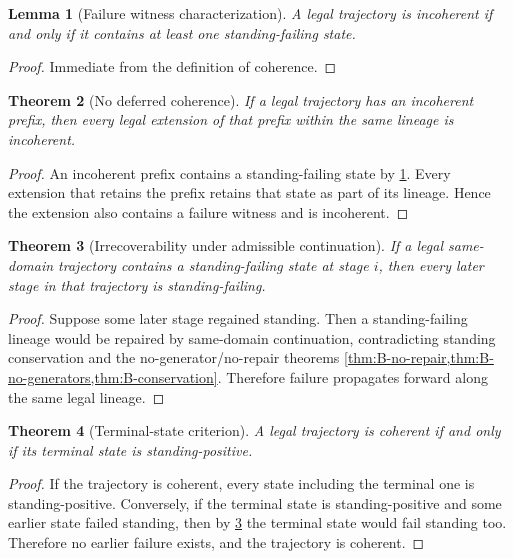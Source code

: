 \documentclass[11pt]{article}
\theoremstyle{plain}
\newtheorem{theorem}{Theorem}[section]
\newtheorem{lemma}[theorem]{Lemma}
\theoremstyle{definition}
\begin{document}
\begin{lemma}[Failure witness characterization]
\label{lem:D-failure}
A legal trajectory is incoherent if and only if it contains at least one standing-failing state.
\end{lemma}

\begin{proof}
Immediate from the definition of coherence.
\end{proof}

\begin{theorem}[No deferred coherence]
\label{thm:D-no-deferred}
If a legal trajectory has an incoherent prefix, then every legal extension of that prefix within the same lineage is incoherent.
\end{theorem}

\begin{proof}
An incoherent prefix contains a standing-failing state by \cref{lem:D-failure}. Every extension that retains the prefix retains that state as part of its lineage. Hence the extension also contains a failure witness and is incoherent.
\end{proof}

\begin{theorem}[Irrecoverability under admissible continuation]
\label{thm:D-irrecoverable}
If a legal same-domain trajectory contains a standing-failing state at stage $i$, then every later stage in that trajectory is standing-failing.
\end{theorem}

\begin{proof}
Suppose some later stage regained standing. Then a standing-failing lineage would be repaired by same-domain continuation, contradicting standing conservation and the no-generator/no-repair theorems \cref{thm:B-no-repair,thm:B-no-generators,thm:B-conservation}. Therefore failure propagates forward along the same legal lineage.
\end{proof}

\begin{theorem}[Terminal-state criterion]
\label{thm:D-terminal}
A legal trajectory is coherent if and only if its terminal state is standing-positive.
\end{theorem}

\begin{proof}
If the trajectory is coherent, every state including the terminal one is standing-positive. Conversely, if the terminal state is standing-positive and some earlier state failed standing, then by \cref{thm:D-irrecoverable} the terminal state would fail standing too. Therefore no earlier failure exists, and the trajectory is coherent.
\end{proof}
\end{document}
